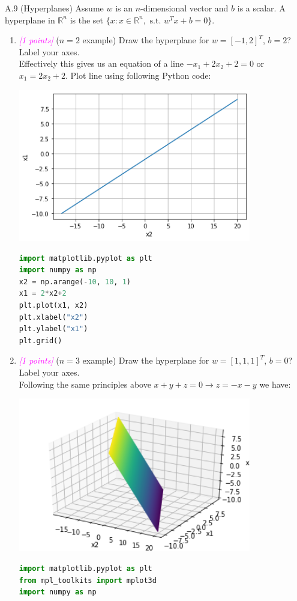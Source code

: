 \documentclass{article}
\newcommand{\field}[1]{\mathbb{#1}}
\newcommand{\1}{\mathbf{1}}
\newcommand{\R}{\field{R}} %
\newcommand{\points}[1]{\small\textcolor{magenta}{\emph{[#1 points]}} \normalsize}
\begin{document}
\newpage
A.9 (Hyperplanes) Assume $w$ is an $n$-dimensional vector and $b$ is a scalar. A hyperplane in $\R^n$ is the set $\{x : x\in \R^n,\text{ s.t. } w^T x + b = 0\}$.
\begin{enumerate}
	\item \points{1} ($n=2$ example) Draw the hyperplane for $w=[-1,2]^T$, $b=2$? Label your axes. \\
	Effectively this gives us an equation of a line $-x_1+2x_2 + 2 = 0$ or $x_1 = 2x_2+2$. Plot line using following Python code:
    \begin{center}
    \includegraphics[width=4in]{HW0_plots/hyperplane.png}
    \end{center} 
    \begin{lstlisting}[language=Python]
import matplotlib.pyplot as plt
import numpy as np
x2 = np.arange(-10, 10, 1)
x1 = 2*x2+2
plt.plot(x1, x2)
plt.xlabel("x2")
plt.ylabel("x1")
plt.grid()
    \end{lstlisting}

	\item \points{1} ($n=3$ example) Draw the hyperplane for $w=[1,1,1]^T$, $b=0$? Label your axes. \\
	Following the same principles above $x+y+z=0 \rightarrow z=-x-y$ we have:
    \begin{center}
    \includegraphics[width=4in]{HW0_plots/hyperplaneB.png}
    \end{center}
    \begin{lstlisting}[language=Python]
import matplotlib.pyplot as plt
from mpl_toolkits import mplot3d
import numpy as np


\end{lstlisting}
\end{enumerate}
\end{document}
